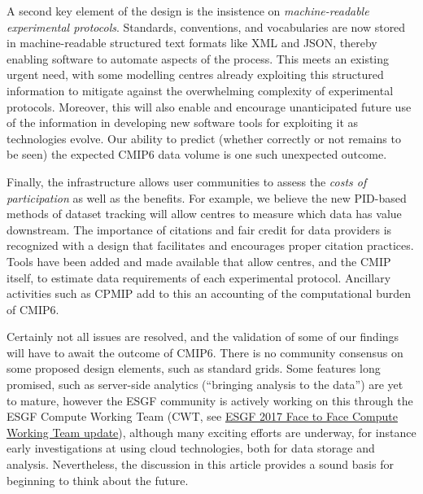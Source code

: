 \documentclass[gmd,manuscript]{copernicus}
\begin{document}
A second key element of the design is the insistence on
\emph{machine-readable experimental protocols}. Standards,
conventions, and vocabularies are now stored in machine-readable
structured text formats like XML and JSON, thereby enabling software
to automate aspects of the process. This meets an existing urgent
need, with some modelling centres already exploiting this structured
information to mitigate against the overwhelming complexity of
experimental protocols. Moreover, this will also enable and encourage
unanticipated future use of the information in developing new software
tools for exploiting it as technologies evolve. Our ability to predict
(whether correctly or not remains to be seen) the expected CMIP6 data
volume is one such unexpected outcome.

Finally, the infrastructure allows user communities to assess the
\emph{costs of participation} as well as the benefits. For example, we
believe the new PID-based methods of dataset tracking will allow
centres to measure which data has value downstream. The importance of
citations and fair credit for data providers is recognized with a
design that facilitates and encourages proper citation practices.
Tools have been added and made available that allow centres, and the
CMIP itself, to estimate data requirements of each experimental
protocol. Ancillary activities such as CPMIP add to this an accounting
of the computational burden of CMIP6.

Certainly not all issues are resolved, and the validation of some of
our findings will have to await the outcome of CMIP6. There is no
community consensus on some proposed design elements, such as standard
grids. Some features long promised, such as server-side analytics
(``bringing analysis to the data'') are yet to mature, however the ESGF
community is actively working on this through the ESGF Compute Working
Team (CWT, see
\hyperlink{https://esgf.llnl.gov/media/2017-F2F/Day2/Day2-CWT_Presentation.pdf}{ESGF 2017 Face to Face Compute Working Team update}), although many
exciting efforts are underway, for instance early investigations at using
cloud technologies, both for data storage and analysis.
Nevertheless, the discussion in this article provides a sound basis
for beginning to think about the future.
\end{document}
